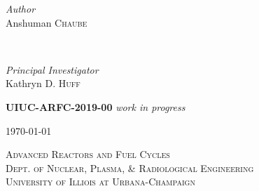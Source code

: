 \documentclass[14pt,a4paper]{article} %
\begin{document}
\begin{titlepage}
    \begin{minipage}{0.4\textwidth}
        \begin{flushleft}
            \large
            \textit{Author}\\
            Anshuman \textsc{Chaube}\\
        \end{flushleft}
    \end{minipage}
    ~
    \begin{minipage}{0.4\textwidth}
        \begin{flushright}
            \large
            \textit{Principal Investigator}\\
            Kathryn D. \textsc{Huff} %
        \end{flushright}
    \end{minipage}
    

    \vspace{1cm}
    \textsc{\LARGE\bfseries UIUC-ARFC-2019-00} \textit{work in progress} %
    \vspace{0.5cm}
    
    
    \vspace{0.5cm} %
    {\large\today} %
    \vspace{0.5cm}

    
    \textsc{\LARGE Advanced Reactors and Fuel Cycles}\\[0.25cm] %
    
    \textsc{\large Dept. of Nuclear, Plasma, \& Radiological Engineering}\\%
    
    \textsc{\large University of Illiois at Urbana-Champaign}\\ %



\end{titlepage}
\end{document}
